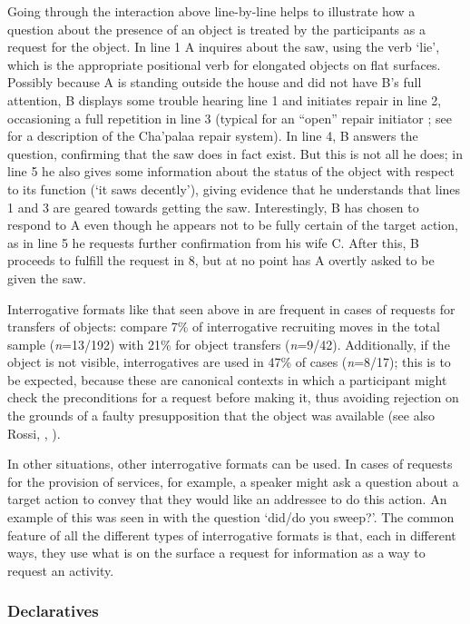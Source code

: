 \documentclass[output=paper]{langsci/langscibook}
\begin{document}
\normalsize
Going through the interaction above line-by-line helps to illustrate how a question about the presence of an object is treated by the participants as a request for the object. In line 1 A inquires about the saw, using the verb ‘lie’, which is the appropriate positional verb for elongated objects on flat surfaces. Possibly because A is standing outside the house and did not have B's full attention, B displays some trouble hearing line 1 and initiates repair in line 2, occasioning a full repetition in line 3 (typical for an “open” repair initiator \citealt{Drew1997}; see \citealt{Floyd2015} for a description of the Cha’palaa repair system). In line 4, B answers the question, confirming that the saw does in fact exist. But this is not all he does; in line 5 he also gives some information about the status of the object with respect to its function (‘it saws decently’), giving evidence that he understands that lines 1 and 3 are geared towards getting the saw. Interestingly, B has chosen to respond to A even though he appears not to be fully certain of the target action, as in line 5 he requests further confirmation from his wife C. After this, B proceeds to fulfill the request in 8, but at no point has A overtly asked to be given the saw.

Interrogative formats like that seen above in  are frequent in cases of requests for transfers of objects: compare 7\% of interrogative recruiting moves in the total sample (\textit{n}=13/192) with 21\% for object transfers (\textit{n}=9/42). Additionally, if the object is not visible, interrogatives are used in 47\% of cases (\textit{n}=8/17); this is to be expected, because these are canonical contexts in which a participant might check the preconditions for a request before making it, thus avoiding rejection on the grounds of a faulty presupposition that the object was available (see also Rossi, , ). 

In other situations, other interrogative formats can be used. In cases of requests for the provision of services, for example, a speaker might ask a question about a target action to convey that they would like an addressee to do this action. An example of this was seen in  with the question ‘did/do you sweep?’. The common feature of all the different types of interrogative formats is that, each in different ways, they use what is on the surface a request for information as a way to request an activity.

\subsubsection{Declaratives}\label{sec:floyd:3.3.4}
\end{document}
